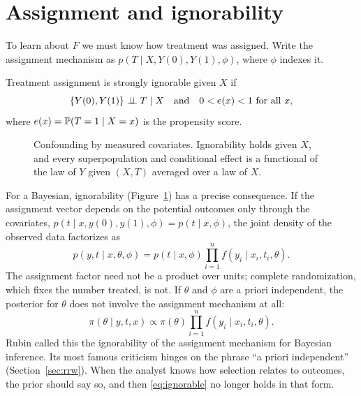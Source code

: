 \section{Assignment and ignorability}\label{sec:ignorability}

To learn about $F$ we must know how treatment was assigned. Write the assignment mechanism as $p(T \mid X, Y(0), Y(1), \phi)$, where $\phi$ indexes it.

\begin{definition}[Ignorability]\label{def:ignorability}
Treatment assignment is strongly ignorable given $X$ if
\[
\{Y(0), Y(1)\} \perp\!\!\!\perp T \mid X \quad\text{and}\quad 0 < e(x) < 1 \text{ for all } x,
\]
where $e(x) = \mathbb{P}(T = 1 \mid X = x)$ is the propensity score\label{def:propensity}.
\end{definition}


\begin{figure}[ht]
\centering
{}
\caption{Confounding by measured covariates. Ignorability holds given $X$, and every superpopulation and conditional effect is a functional of the law of $Y$ given $(X, T)$ averaged over a law of $X$.}
\label{fig:dagconf}
\end{figure}

For a Bayesian, ignorability (Figure~\ref{fig:dagconf}) has a precise consequence. If the assignment vector depends on the potential outcomes only through the covariates, $p(t \mid x, y(0), y(1), \phi) = p(t \mid x, \phi)$, the joint density of the observed data factorizes as
\[
p(y, t \mid x, \theta, \phi) = p(t \mid x, \phi) \prod_{i=1}^n f(y_i \mid x_i, t_i, \theta).
\]
The assignment factor need not be a product over units; complete randomization, which fixes the number treated, is not. If $\theta$ and $\phi$ are a priori independent, the posterior for $\theta$ does not involve the assignment mechanism at all:
\begin{equation}
\pi(\theta \mid y, t, x) \propto \pi(\theta) \prod_{i=1}^n f(y_i \mid x_i, t_i, \theta).
\label{eq:ignorable}
\end{equation}
Rubin called this the ignorability of the assignment mechanism for Bayesian inference. Its most famous criticism hinges on the phrase ``a priori independent'' (Section~\ref{sec:rrw}). When the analyst knows how selection relates to outcomes, the prior should say so, and then \eqref{eq:ignorable} no longer holds in that form.

